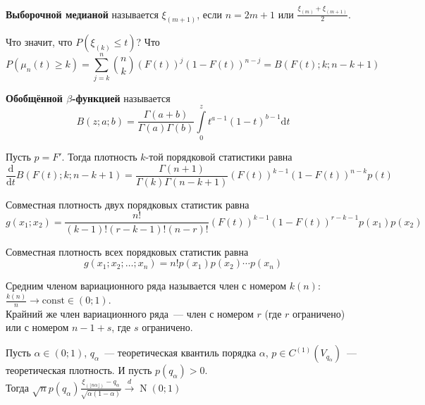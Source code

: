\documentclass{article}
\begin{document}
    \begin{definition}
        \textbf{Выборочной медианой} называется $\xi_{(m+1)}$, если $n=2m+1$ или $\frac{\xi_{(m)}+\xi_{(m+1)}}2$.
    \end{definition}
    \begin{claim}
        Что значит, что $P(\xi_{(k)}\leqslant t)$? Что
        \[
        P(\mu_n(t)\geqslant k)=\sum\limits_{j=k}^n\binom nk(F(t))^j(1-F(t))^{n-j}=B(F(t);k;n-k+1)
        \]
    \end{claim}
    \begin{definition}
        \textbf{Обобщённой $\beta$-функцией} называется
        \[
        B(z;a;b)=\frac{\Gamma(a+b)}{\Gamma(a)\Gamma(b)}\int\limits_0^zt^{a-1}(1-t)^{b-1}\mathrm dt
        \]
    \end{definition}
    \begin{claim}
        Пусть $p=F'$. Тогда плотность $k$-той порядковой статистики равна
        \[
        \frac{\mathrm d}{\mathrm dt}B(F(t);k;n-k+1)=\frac{\Gamma(n+1)}{\Gamma(k)\Gamma(n-k+1)}(F(t))^{k-1}(1-F(t))^{n-k}p(t)
        \]
    \end{claim}
    \begin{claim}
        Совместная плотность двух порядковых статистик равна
        \[
        g(x_1;x_2)=\frac{n!}{(k-1)!(r-k-1)!(n-r)!}(F(t))^{k-1}(1-F(t))^{r-k-1}p(x_1)p(x_2)
        \]
    \end{claim}
    \begin{claim}
        Совместная плотность всех порядковых статистик равна
        \[
        g(x_1;x_2;\ldots;x_n)=n!p(x_1)p(x_2)\cdots p(x_n)
        \]
    \end{claim}
    \begin{definition}
        Средним членом вариационного ряда называется член с номером $k(n)$: $\frac{k(n)}n\rightarrow\mathrm{const}\in(0;1)$.\\
        Крайний же член вариационного ряда~--- член с номером $r$ (где $r$ ограничено) или с номером $n-1+s$, где $s$ ограничено.
    \end{definition}
    \begin{theorem}
        Пусть $\alpha\in(0;1)$, $q_\alpha$~--- теоретическая квантиль порядка $\alpha$, $p\in C^{(1)}(V_{q_\alpha})$~---теоретическая плотность. И пусть $p(q_\alpha)>0$.\\
        Тогда $\sqrt np(q_\alpha)\frac{\xi_{(\lfloor n\alpha\rfloor)}-q_\alpha}{\sqrt{\alpha(1-\alpha)}}\overset d\longrightarrow\operatorname{N}(0;1)$
    \end{theorem}
\end{document}
